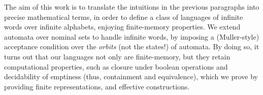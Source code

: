 The aim of this work is to translate the intuitions in the previous paragraphs into precise mathematical terms, in order to define a class of languages of infinite words over infinite alphabets, enjoying finite-memory properties. We extend automata over nominal sets to handle infinite words, by imposing a (Muller-style) acceptance condition 
over the \emph{orbits} (not the states!) of automata. By doing so, it turns out that our languages not only are finite-memory, but they retain computational properties, such as closure under boolean operations and decidability of emptiness (thus, containment and equivalence), which we prove by providing finite representations, and effective constructions. 
%
%



